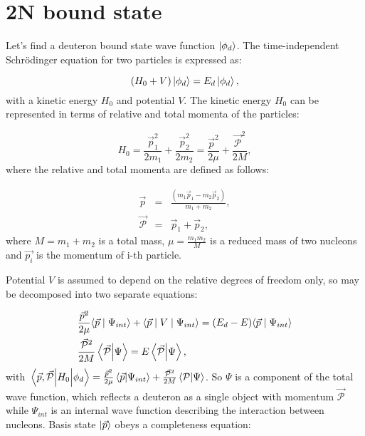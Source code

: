 \section{2N bound state}
    \label{sec:deut_bound}

    Let's find a deuteron bound state wave function $\ket{\phi_d}$. 
    The time-independent Schr\"{o}dinger equation for two particles is expressed as:

    \begin{equation}
        (H_0 + V) \ket{\phi_d}  = E_d \ket{\phi_d},
        \label{shrod_bound}
    \end{equation}
    with a kinetic energy $H_0$ and potential $V$. 
    The kinetic energy $H_0$ can be represented in terms of  relative and total momenta
    of the particles:

    \begin{equation}
        H_0 = \frac{\vec{p}_1^2}{2m_1} + \frac{\vec{p}_2^2}{2m_2} = 
        \frac{\vec{p}^2}{2\mu} + \frac{\vec{\mathcal{P}}^2}{2M}, 
    \end{equation}
    where the relative and total momenta are defined as follows:

    \begin{eqnarray}
        \vec{p} &=& \frac{(m_1\vec{p}_1 - m_2\vec{p}_2)}{m_1 + m_2},\\
        \vec{\mathcal{P}} &=& \vec{p}_1 + \vec{p}_2,
    \end{eqnarray}
    where $M = m_1 + m_2$ is a total mass, $\mu = \frac{m_1m_2}{M}$ is a reduced mass of two nucleons and 
    $\vec{p_i}$ is the momentum of i-th particle.

    Potential $V$ is assumed to depend on the relative degrees of freedom only, so
     may be decomposed into two separate equations:

    \begin{eqnarray}
        &\frac{\vec{p}^2}{2\mu} \langle \vec{p} \mid \Psi_{int} \rangle +
        \langle \vec{p} \mid V \mid \Psi_{int} \rangle = 
        (E_d - E)\langle \vec{p} \mid \Psi_{int} \rangle \label{se1}\\
        &\frac{\vec{\mathcal{P}}^2}{2M} \braket{ \vec{\mathcal{P}} }{ \Psi } = 
        E\braket{ \vec{\mathcal{P}} }{ \Psi } \label{se2},
    \end{eqnarray}
    with $\matrixel{\vec{p},\vec{\mathcal{P}}}{H_0}{\phi_d} = \frac{\vec{p}^2}{2\mu} \braket{\vec{p}}{\Psi_{int}} +
    \frac{\vec{\mathcal{P}}^2}{2M} \braket {\mathcal{P}} {\Psi} $. So $\Psi$ is a component 
    of the total wave function, which reflects a deuteron as a single object with momentum $\vec{\mathcal{P}}$
    while $\Psi_{int}$ is an internal wave function describing the interaction between nucleons.
    Basis state $\ket{\vec{p}}$  obeys a completeness
    equation:

